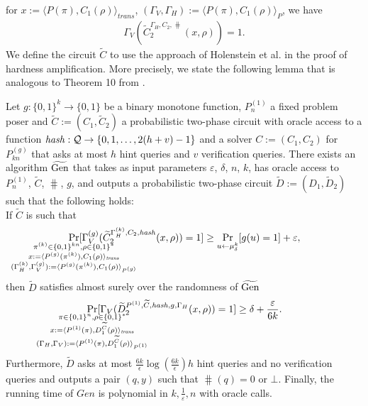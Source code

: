 for $x := \langle P(\pi), C_1(\rho) \rangle_{\mathit{trans}}$,
$(\Gamma_V, \Gamma_H) := \langle P(\pi), C_1(\rho) \rangle_{P}$, we have
\begin{align*}
\Gamma_V(\widetilde{C}_2^{\Gamma_H, C_2, \hash}(x, \rho)) = 1.
\end{align*}
We define the circuit $\widetilde{C}$ to use the approach of Holenstein et al. \cite{holenstein2011general} in the proof of hardness amplification.
More precisely, we state the following lemma that is analogous to Theorem 10 from \cite{holenstein2011general}.
\begin{lemma}
  \label{lemma:sec_amp_for_p_hash}
  Let $g: \{0,1\}^{k} \rightarrow \{0,1\}$ be a binary monotone function, $P_n^{(1)}$ a fixed
  problem poser and $\widetilde{C} := (C_1, \widetilde{C}_2)$ a probabilistic two-phase circuit
  with oracle access to a function $\operatorname{\mathit{hash}}: \mathcal{Q} \rightarrow \{0,1,\dots, 2(h+v)-1\}$
  and a solver $C := (C_1, C_2)$ for $P_{kn}^{(g)}$ that asks at most $h$ hint queries and $v$ verification queries.
  There exists an algorithm $\widetilde{\operatorname{\text{Gen}}}$ that takes as input parameters $\varepsilon$, $\delta$, $n$, $k$,
  has oracle access to $P_n^{(1)}$,  $\widetilde{C}$, $\hash$, $g$,
  and outputs a probabilistic two-phase circuit $\widetilde{D} := (D_1, \widetilde{D}_2)$ such that the following holds: \\
  If $\widetilde{C}$ is such that
  \begin{align*}
    \underset{\mathclap{\substack{
          \pi^{(k)} \in \{0,1\}^{kn}, \rho \in \{0,1\}^{*} \\
          x:= \langle P^{(g)}(\pi^{(k)}), {C}_1(\rho) \rangle_{\mathit{trans}} \\
          (\Gamma_H^{(k)}, \Gamma_V^{(g)}) := \langle P^{(g)}(\pi^{(k)}), C_1(\rho) \rangle_{P^{(g)}}}}}
    {\Pr}[\Gamma_V^{(g)}(\widetilde{C}_2^{\Gamma_H^{(k)}, C_2, \hash}(x,\rho)) = 1]
    \geq \underset{u \leftarrow \mu_\delta^k}{\Pr}[g(u) = 1] + \varepsilon,
  \end{align*}
  then $\widetilde{D}$ satisfies almost surely over the randomness of $\widetilde{\operatorname{\text{Gen}}}$
  \begin{align*}
    \underset{
      \mathclap{
      \substack{
        \pi \in \{0,1\}^{n}, \rho \in \{0,1\}^{*} \\
        x := \langle P^{(1)}(\pi), D_1^{\widetilde{C}}(\rho) \rangle_{\mathit{trans}} \\
        (\Gamma_H, \Gamma_V) := \langle P^{(1)}(\pi), D_1^{\widetilde{C}}(\rho) \rangle_{P^{(1)}}}}}
    {\Pr}[\Gamma_V(\widetilde{D}_2^{P^{(1)}, \widetilde{C}, \hash, g, \Gamma_H}(x, \rho)) = 1] \geq \delta + \frac{\varepsilon}{6k}.
  \end{align*}
  Furthermore, $\widetilde{D}$ asks at most $\frac{6k}{\epsilon}\log\left(\frac{6k}{\epsilon}\right) h$ hint queries and no verification queries
  and outputs a pair $(q, y)$ such that $\hash(q) = 0$ or $\bot$.
  Finally, the running time of $\mathit{Gen}$ is polynomial in $k, \frac{1}{\varepsilon}, n$ with oracle calls.
\end{lemma}
